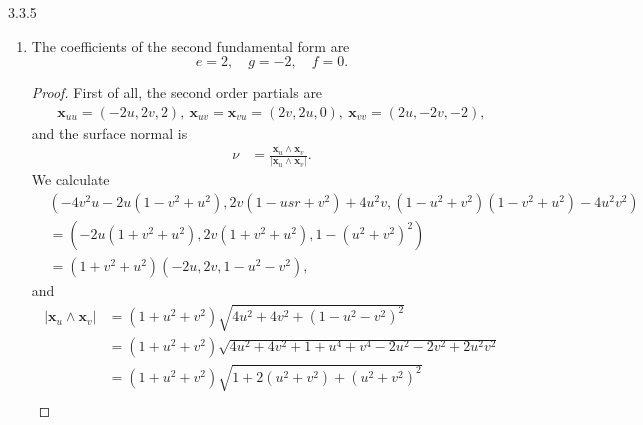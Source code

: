 \documentclass[11pt]{article}
\begin{document}
\begin{problem}{3.3.5}
\begin{enumerate}[label=(\alph*)]
\begin{proof}
\begin{equation}
\begin{aligned}
        &= 4 uv - 4 uv = 0.
      \end{aligned}
      \end{equation}
        \end{proof}
  \item The coefficients of the second fundamental form are
        \begin{equation}
        \label{eq:6}
        e = 2, \quad g = -2, \quad f = 0.
      \end{equation}
        \begin{proof}
          First of all, the second order partials are
          \begin{equation}
          \label{eq:19}
          \begin{aligned}
            \mathbf{x}_{uu} = \left( -2u, 2v, 2 \right), \ \mathbf{x}_{uv} = \mathbf{x}_{vu} = \left( 2v, 2u, 0 \right), \ \mathbf{x}_{vv} = \left( 2u, -2v, -2 \right),
          \end{aligned}
        \end{equation}
        and the surface normal is
        \begin{equation}
        \label{eq:20}
        \begin{aligned}
        \nu &= \frac{\mathbf{x}_u \wedge \mathbf{x}_v }{| \mathbf{x}_u \wedge \mathbf{x}_v |}.
        \end{aligned}
      \end{equation}
      We calculate
      \begin{equation}
        \begin{aligned}
          &\left(-4v^2u - 2u(1-v^2 + u^2), 2v(1 - usr + v^2) + 4 u^2v, (1- u^2 + v^2)(1 - v^2 + u^2) -4 u^2 v^2\right) \\
          &= \left(-2u(1 + v^2 + u^2), 2v(1 + v^2 + u^2), 1 - (u^2 + v^2)^2\right) \\
          &= (1 + v^2 + u^2)(-2u, 2v, 1 - u^2 - v^2),
        \end{aligned}
      \end{equation}
      and
      \begin{equation}
      \label{eq:21}
      \begin{aligned}
        | \mathbf{x}_u \wedge \mathbf{x}_v | &= (1 + u^2 + v^2) \sqrt{4 u^2 + 4 v^2 + (1 - u^2 - v^2)^2} \\
                                        &= (1 + u^2 + v^2) \sqrt{4 u^2 + 4 v^2 + 1 + u^{4} + v^4 - 2 u^2 - 2 v^2 + 2 u^2 v^2} \\
                                        &= (1 + u^2 + v^2) \sqrt{1 + 2(u^2 + v^2) + (u^2 + v^2)^2} \\

\end{aligned}
\end{equation}
\end{proof}
\end{enumerate}
\end{problem}
\end{document}
